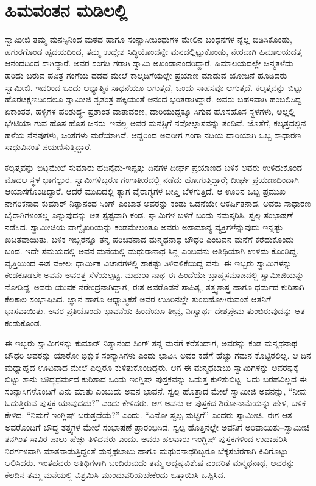 
\chapter{ಹಿಮವಂತನ ಮಡಿಲಲ್ಲಿ}

\noindent

ಸ್ವಾಮೀಜಿ ತಮ್ಮ ಮನಸ್ಸಿನಿಂದ ಮಠದ ಹಾಗೂ ಸಂನ್ಯಾಸೀಬಂಧುಗಳ ಮೇಲಿನ ಬಂಧನಗಳ ನ್ನೆಲ್ಲ ಬಿಡಿಸಿಕೊಂಡು, ಹಗುರಗೊಂಡ ಹೃದಯದಿಂದ, ತಮ್ಮ ಉದ್ದೇಶ ಸಿದ್ಧಿಯೊಂದನ್ನೇ ಮನದಲ್ಲಿಟ್ಟುಕೊಂಡು, ನೇರವಾಗಿ ಹಿಮಾಲಯದತ್ತ ಆನಂದದಿಂದ ಸಾಗಿದ್ದಾರೆ. ಅವರ ಸಂಗಡಿ ಗರಾಗಿ ಸ್ವಾಮಿ ಅಖಂಡಾನಂದರಿದ್ದಾರೆ. ಹಿಮಾಲಯದಲ್ಲೇ ಜನ್ಮತಳೆದು ಹರಿದು ಬರುವ ಪವಿತ್ರ ಗಂಗೆಯ ದಡದ ಮೇಲೆ ಕಾಲ್ನಡಿಗೆಯಲ್ಲೇ ಪ್ರಯಾಣ ಮಾಡುವ ಯೋಜನೆ ಹೂಡಿದರು ಸ್ವಾಮೀಜಿ. ಇದರಿಂದ ಒಂದು ಆಧ್ಯಾತ್ಮಿಕ ಸಾಧನೆಯೂ ಆಗುತ್ತದೆ, ಒಂದು ಸಾಹಸವೂ ಆಗುತ್ತದೆ. ಕಲ್ಕತ್ತವನ್ನು ಬಿಟ್ಟು ಹೊರಟಕ್ಷಣದಿಂದಲೂ ಸ್ವಾಮೀಜಿ ಸ್ವತಂತ್ರ ಹಕ್ಕಿಯಂತೆ ಆನಂದ ಭರಿತರಾಗಿದ್ದಾರೆ. ಅವರು ಬಹಳವಾಗಿ ಹಂಬಲಿಸಿದ್ದ ಏಕಾಂತತೆ, ಹಳ್ಳಿಗಳ ಪರಿಶುದ್ಧ- ಪ್ರಶಾಂತ ವಾತಾವರಣ, ದಾರಿಯುದ್ದಕ್ಕೂ ಸಿಗುವ ಹೊಸಹೊಸ ಸ್ಥಳಗಳು, ಅಲ್ಲಲ್ಲಿ ಭೇಟಿಯಾ ಗುವ ಹೊಸ ಹೊಸ ಜನರು–ಇವೆಲ್ಲ ಅವರ ಮನಸ್ಸಿಗೆ ನವೋಲ್ಲಾಸವನ್ನು ತಂದಿವೆ. ಜೊತೆಗೆ, ಕಲ್ಕತ್ತದಲ್ಲಿನ ಹಳೆಯ ನೆನಪುಗಳು, ಚಿಂತೆಗಳು ಮರೆಯಾಗಿವೆ. ಆದ್ದರಿಂದ ಅವರೀಗ ಗಂಗಾ ನದಿಯ ದಾರಿಯಾಗಿ ಒಬ್ಬ ಸಾಧಾರಣ ಸಾಧುವಿನಂತೆ ಪಯಣಿಸುತ್ತಿದ್ದಾರೆ.

ಕಲ್ಕತ್ತವನ್ನು ಬಿಟ್ಟಮೇಲೆ ಸುಮಾರು ಹದಿನೈದು-ಇಪ್ಪತ್ತು ದಿನಗಳ ದೀರ್ಘ ಪ್ರಯಾಣದ ಬಳಿಕ ಅವರು ಉಳಿದುಕೊಂಡ ಮೊದಲ ಸ್ಥಳ ಭಾಗಲ್ಪುರ. ಸ್ವಾಮಿಗಳಿಬ್ಬರೂ ಗಂಗಾತೀರದಲ್ಲಿ ನಡೆದು ಹೋಗುತ್ತಿದ್ದಾರೆ; ದೀರ್ಘ ಪ್ರಯಾಣದಿಂದಾಗಿ ಆಯಾಸಗೊಂಡಿದ್ದಾರೆ. ಆದರೆ ಮುಖದಲ್ಲಿ ತ್ಯಾಗ ವೈರಾಗ್ಯಗಳ ದೀಪ್ತಿ ಬೆಳಗುತ್ತಿದೆ. ಆ ಊರಿನ ಒಬ್ಬ ಪ್ರಮುಖ ನಾಗರಿಕನಾದ ಕುಮಾರ್ ನಿತ್ಯಾನಂದ ಸಿಂಗ್ ಎಂಬಾತ ಅವರನ್ನು ಕಂಡು ಒಡನೆಯೇ ಆಕರ್ಷಿತನಾದ. ಅವರು ಸಾಧಾರಣ ಬೈರಾಗಿಗಳಂತಲ್ಲ ಎನ್ನುವುದನ್ನು ಆತ ಸ್ಪಷ್ಟವಾಗಿ ಕಂಡ. ಸ್ವಾಮಿಗಳ ಬಳಿಗೆ ಬಂದು ನಮಸ್ಕರಿಸಿ, ಸ್ವಲ್ಪ ಸಂಭಾಷಣೆ ನಡೆಸಿದ. ಸ್ವಾಮೀಜಿಯ ವಾಗ್ವೈಖರಿಯನ್ನು ಕಂಡಮೇಲಂತೂ ಅವರು ಅಸಾಮಾನ್ಯ ವ್ಯಕ್ತಿಗಳೆನ್ನುವುದು ಇನ್ನಷ್ಟು ಖಚಿತವಾಯಿತು. ಬಳಿಕ ಇಬ್ಬರನ್ನೂ ತನ್ನ ಪರಿಚಿತನಾದ ಮನ್ಮಥನಾಥ ಚೌಧರಿ ಎಂಬವನ ಮನೆಗೆ ಕರೆದುಕೊಂಡು ಬಂದ. ಇದೇ ಸಮಯದಲ್ಲಿ ಅವನ ಮನೆಯಲ್ಲಿ ಮಥುರಾನಾಥ ಸಿನ್ಹ ಎಂಬವನು ಅತಿಥಿಯಾಗಿ ಉಳಿದು ಕೊಂಡಿದ್ದ. ವೃತ್ತಿಯಿಂದ ಈತ ವಕೀಲ; ಧಾರ್ಮಿಕ ವಿಚಾರಗಳಲ್ಲಿ ಸಾಕಷ್ಟು ತಿಳಿವಳಿಕೆಯಿದ್ದ ವನು. ಈ ಇಬ್ಬರು ಸ್ವಾಮಿಗಳನ್ನು ಕಂಡಕೂಡಲೇ ಅವನು ಅವರತ್ತ ಸೆಳೆಯಲ್ಪಟ್ಟ. ಮಥುರಾ ನಾಥ ಈ ಹಿಂದೆಯೇ ಬ್ರಾಹ್ಮಸಮಾಜದಲ್ಲಿ ಸ್ವಾಮೀಜಿಯನ್ನು ನೋಡಿದ್ದ–ಅವರು ಯುವಕ ನರೇಂದ್ರನಾಗಿದ್ದಾಗ, ಈತ ಅವರೊಡನೆ ಸಾಹಿತ್ಯ, ತತ್ತ್ವಶಾಸ್ತ್ರ ಹಾಗೂ ಧರ್ಮದ ಕುರಿತಾಗಿ ಕೆಲಕಾಲ ಸಂಭಾಷಿಸಿದ. ಜ್ಞಾನ ಹಾಗೂ ಆಧ್ಯಾತ್ಮಿಕತೆ ಅವರ ಉಸಿರಿನಲ್ಲೇ ತುಂಬಿಹೋಗಿರುವಂತೆ ಆತನಿಗೆ ಭಾಸವಾಯಿತು. ಅವರ ಪ್ರತಿಯೊಂದು ಭಾವನೆಯ ಹಿಂದೆಯೂ ತೀವ್ರ, ನಿಃಸ್ವಾರ್ಥ ದೇಶಪ್ರೇಮ ತುಂಬಿರುವುದನ್ನು ಆತ ಕಂಡುಕೊಂಡ.

ಈ ಇಬ್ಬರು ಸ್ವಾಮಿಗಳನ್ನು ಕುಮಾರ್ ನಿತ್ಯಾನಂದ ಸಿಂಗ್ ತನ್ನ ಮನೆಗೆ ಕರೆತಂದಾಗ, ಅವರನ್ನು ಕಂಡ ಮನ್ಮಥನಾಥ ಚೌಧರಿ ಅವರನ್ನು ಯಾರೋ ಭಿಕ್ಷುಕ ಸಂನ್ಯಾಸಿಗಳು ಎಂದು ಭಾವಿಸಿ ಅವರ ಕಡೆಗೆ ಹೆಚ್ಚು ಗಮನ ಕೊಟ್ಟಿರಲಿಲ್ಲ. ಆ ದಿನ ಮಧ್ಯಾಹ್ನದ ಊಟವಾದ ಮೇಲೆ ಎಲ್ಲರೂ ಕುಳಿತುಕೊಂಡಿದ್ದರು. ಆಗ ಈ ಮನ್ಮಥಬಾಬು ಸ್ವಾಮಿಗಳನ್ನು ಅವರಷ್ಟಕ್ಕೆ ಬಿಟ್ಟು ತಾನು ಬೌದ್ಧಧರ್ಮದ ಕುರಿತಾದ ಒಂದು ಇಂಗ್ಲಿಷ್ ಪುಸ್ತಕವನ್ನು ಓದುತ್ತ ಕುಳಿತುಬಿಟ್ಟ. ಓದು ಬರಹವಿಲ್ಲದ ಈ ಸಂನ್ಯಾಸಿಗಳೊಂದಿಗೆ ಏನು ಮಾತು ಎಂಬುದು ಅವನ ಭಾವನೆ. ಸ್ವಲ್ಪ ಹೊತ್ತಾದ ಮೇಲೆ ಸ್ವಾಮೀಜಿ ಅವನನ್ನು, “ನೀವು ಓದುತ್ತಿರುವ ಪುಸ್ತಕ ಯಾವುದದು?” ಎಂದು ಕೇಳಿದರು. ಆಗ ಅವನು ಆ ಪುಸ್ತಕದ ಶಿರೋನಾಮೆಯನ್ನು ಹೇಳಿ, ಬಳಿಕ ಕೇಳಿದ: “ನಿಮಗೆ ಇಂಗ್ಲಿಷ್ ಬರುತ್ತದೆಯೆ?” ಎಂದು. “ಏನೋ ಸ್ವಲ್ಪ ಮಟ್ಟಿಗೆ” ಎಂದರು ಸ್ವಾಮೀಜಿ. ಈಗ ಆತ ಅವರೊಂದಿಗೆ ಬೌದ್ಧ ತತ್ತ್ವಗಳ ಮೇಲೆ ಸಂಭಾಷಣೆ ಪ್ರಾರಂಭಿಸಿದ. ಸ್ವಲ್ಪ ಹೊತ್ತಿನಲ್ಲೇ ಅವನಿಗೆ ಅರಿವಾಯಿತು–ಸ್ವಾಮೀಜಿ ತನಗಿಂತ ಸಾವಿರ ಪಾಲು ಹೆಚ್ಚು ತಿಳಿದವರು ಎಂದು. ಅವರು ಹಲವಾರು ಇಂಗ್ಲಿಷ್ ಪುಸ್ತಕಗಳಿಂದ ಉದಾಹರಿಸಿ ನಿರರ್ಗಳವಾಗಿ ಮಾತನಾಡುತ್ತಿದ್ದಂತೆ ಮನ್ಮಥಬಾಬು ಹಾಗೂ ಮಥುರನಾಥರಿಬ್ಬರೂ ಬೆಕ್ಕಸಬೆರಗಾಗಿ ಕಿವಿಗೊಟ್ಟು ಆಲಿಸಿದರು. ಇಂತಹವರು ಅತಿಥಿಗಳಾಗಿ ಬಂದಿರುವುದು ತಮ್ಮ ಅದೃಷ್ಟವಿಶೇಷ ಎಂದರಿತ ಮನ್ಮಥನಾಥ, ಅವರನ್ನು ಕೆಲದಿನ ತಮ್ಮ ಮನೆಯಲ್ಲಿ ವಿಶ್ರಮಿಸಿ ಮುಂದುವರಿಯಬೇಕೆಂದು ಒತ್ತಾಯಿಸಿ ಒಪ್ಪಿಸಿದ.

